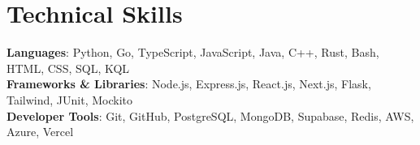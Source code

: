 \section{Technical Skills}
\begin{itemize}[leftmargin=0.15in, label={}]
    \small{\item{     
        \textbf{Languages}{: Python, Go, TypeScript, JavaScript, Java, C++, Rust, Bash, HTML, CSS, SQL, KQL} \\
     
        \textbf{Frameworks \& Libraries}{: Node.js, Express.js, React.js, Next.js, Flask, Tailwind, JUnit, Mockito} \\

        \textbf{Developer Tools}{: Git, GitHub, PostgreSQL, MongoDB, Supabase, Redis, AWS, Azure, Vercel} \\
    }}
\end{itemize}